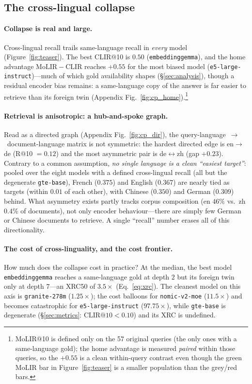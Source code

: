 \documentclass[11pt]{article}
\begin{document}
\subsection{The cross-lingual collapse}
\label{ssec:cp}

\paragraph{Collapse is real and large.}
Cross-lingual recall trails same-language recall in \emph{every} model
(Figure~\ref{fig:teaser}). The best CLIR@10 is $0.50$ (\texttt{embeddinggemma}),
and the home advantage $\mathrm{MoLIR}{-}\mathrm{CLIR}$ reaches $+0.55$ for the
most biased model (\texttt{e5-large-instruct})---much of which gold availability
shapes (\S\ref{sec:analysis}), though a residual encoder bias remains: a
same-language copy of the answer is far easier to retrieve than its foreign twin
(Appendix Fig.~\ref{fig:cp_home}).\footnote{MoLIR@10 is defined only on the 57 original
queries (the only ones with a same-language gold); the home advantage is
measured \emph{paired} within those queries, so the $+0.55$ is a clean
within-query contrast even though the green MoLIR bar in Figure~\ref{fig:teaser}
is a smaller population than the grey/red bars.}

\paragraph{Retrieval is anisotropic: a hub-and-spoke graph.}
Read as a directed graph (Appendix Fig.~\ref{fig:cp_dir}), the
query-language~$\rightarrow$~document-language matrix is not symmetric: the
hardest directed edge is en$\rightarrow$de (R@10 $=0.12$) and the most
asymmetric pair is de$\leftrightarrow$zh (gap $+0.23$). Contrary to a common
assumption, \emph{no single language is a clean ``easiest target''}: pooled over
the eight models with a defined cross-lingual recall (all but the degenerate
\texttt{gte-base}), French ($0.375$) and English ($0.367$) are
nearly tied as targets (within $0.01$ of each other), with Chinese ($0.350$) and
German ($0.309$) behind. What asymmetry exists partly tracks corpus composition (en
$46\%$ vs.\ zh $0.4\%$ of documents), not only encoder behaviour---there are
simply few German or Chinese documents to retrieve. A single ``recall'' number
erases all of this directionality.

\paragraph{The cost of cross-linguality, and the cost frontier.}
How much does the collapse cost in practice? At the median, the best model
\texttt{embeddinggemma} reaches a same-language gold at depth $2$ but its foreign
twin only at depth $7$---an XRC50 of $\mathbf{3.5\times}$ (Eq.~\ref{eq:xrc}). The
cleanest model on this axis is \texttt{granite-278m} ($1.25\times$); the cost
balloons for \texttt{nomic-v2-moe} ($11.5\times$) and becomes catastrophic for
\texttt{e5-large-instruct} ($97.75\times$), while \texttt{gte-base} is degenerate
(\S\ref{sec:metrics}: $\mathrm{CLIR@10}<0.10$) and its XRC is undefined.
\end{document}
